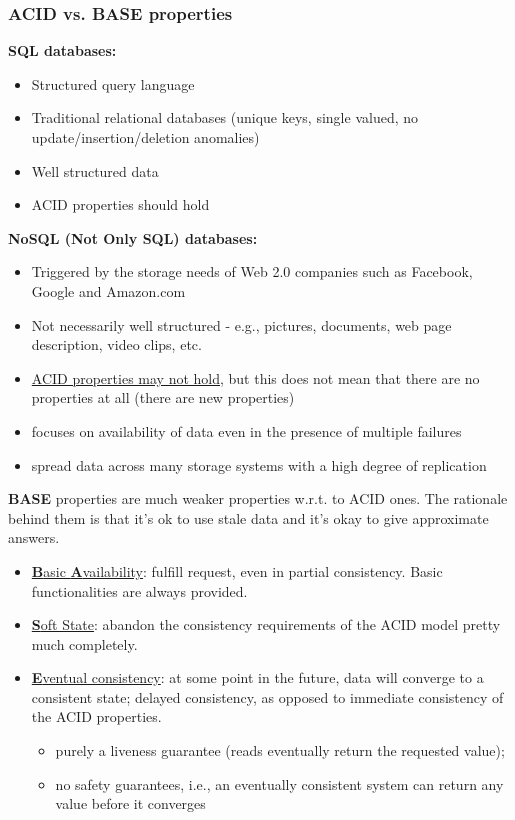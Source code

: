 \documentclass[10pt,a4paper]{article}
\begin{document}
\subsubsection{ACID vs. BASE properties}
\textbf{SQL databases:}
\begin{itemize}
	\item Structured query language
	\item Traditional relational databases (unique keys, single valued, no update/insertion/deletion anomalies)
	\item Well structured data
	\item ACID properties should hold
\end{itemize}
\textbf{NoSQL (Not Only SQL) databases:}
\begin{itemize}
	\item Triggered by the storage needs of Web 2.0 companies such as Facebook, Google and Amazon.com
	\item Not necessarily well structured - e.g., pictures, documents, web page description, video clips, etc.
	\item \uline{ACID properties may not hold}, but this does not mean that there are no properties at all (there are new properties)
	\item focuses on availability of data even in the presence of multiple failures
	\item spread data across many storage systems with a high degree of replication
\end{itemize}
\textbf{BASE} properties are much weaker properties w.r.t. to ACID ones. The rationale behind them is that it's ok to use stale data and it's okay to give approximate answers. 
\begin{itemize}
	\item \uline{\textbf{B}asic \textbf{A}vailability}: fulfill request, even in partial consistency. Basic functionalities are always provided.
	\item \uline{\textbf{S}oft State}: abandon the consistency requirements of the ACID model pretty much completely.
	\item \uline{\textbf{E}ventual consistency}: at some point in the future, data will converge to a consistent state; delayed consistency, as opposed to immediate consistency of the ACID properties.
	\begin{itemize}
		\item purely a liveness guarantee (reads eventually return the requested value);
		\item no safety guarantees, i.e., an eventually consistent system can return any value before it converges
	\end{itemize}
\end{itemize}
\end{document}
